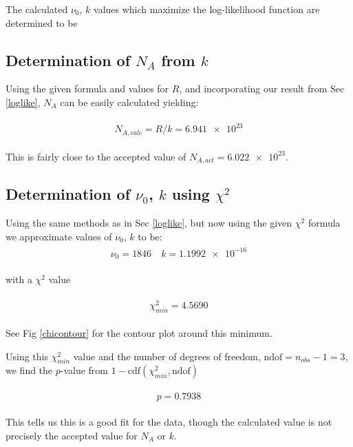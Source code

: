\documentclass[paper=a4, fontsize=11pt]{scrartcl} %
\numberwithin{equation}{section} %
\numberwithin{figure}{section} %
\numberwithin{table}{section} %
\numberwithin{equation}{subsection}
\begin{document}
The calculated $\nu_0$, $k$ values which maximize the log-likelihood function are determined to be 


\subsection{Determination of $N_A$ from $k$}

Using the given formula and values for $R$, and incorporating our result from Sec \ref{loglike}, $N_A$ can be easily calculated yielding:

\begin{align}
\begin{split}
{N}_{A, calc} = R/{k} = \num{6.941e+23}
\end{split}
\end{align}

This is fairly close to the accepted value of $N_{A, act}=\num{6.022e23}$.

\subsection{Determination of $\nu_0$, $k$ using $\chi^2$}

Using the same methods as in Sec \ref{loglike}, but now using the given $\chi^2$ formula we approximate values of $\nu_0$, $k$ to be:
\begin{align}
\begin{split}
\nu_0 = 1846 \quad k = \num{1.1992e-16}
\end{split}
\end{align}

with a $\chi^2$ value 

\begin{align}
\begin{split}
\chi^2_{min} = 4.5690
\end{split}
\end{align}

See Fig \ref{chicontour} for the contour plot around this minimum.

Using this $\chi^2_{min}$ value and the number of degrees of freedom, $\textrm{ndof} = n_{obs} -1 = 3$, we find the $p$-value from $1-\textrm{cdf}(\chi^2_{min}, \textrm{ndof})$

\begin{align}
\begin{split}
p = 0.7938
\end{split}
\end{align}

This tells us this is a good fit for the data, though the calculated value is not precisely the accepted value for $N_A$ or $k$.
\end{document}
